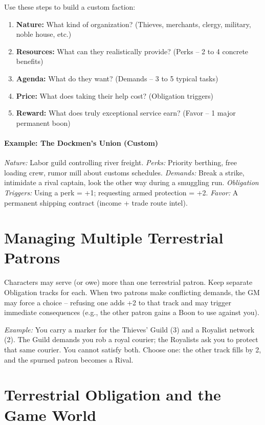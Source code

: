 Use these steps to build a custom faction:

\begin{enumerate}
  \item \textbf{Nature:} What kind of organization? (Thieves, merchants, clergy, military, noble house, etc.)
  \item \textbf{Resources:} What can they realistically provide? (Perks – 2 to 4 concrete benefits)
  \item \textbf{Agenda:} What do they want? (Demands – 3 to 5 typical tasks)
  \item \textbf{Price:} What does taking their help cost? (Obligation triggers)
  \item \textbf{Reward:} What does truly exceptional service earn? (Favor – 1 major permanent boon)
\end{enumerate}

\paragraph{Example: The Dockmen’s Union (Custom)}  
\textit{Nature:} Labor guild controlling river freight.  
\textit{Perks:} Priority berthing, free loading crew, rumor mill about customs schedules.  
\textit{Demands:} Break a strike, intimidate a rival captain, look the other way during a smuggling run.  
\textit{Obligation Triggers:} Using a perk = +1; requesting armed protection = +2.  
\textit{Favor:} A permanent shipping contract (income + trade route intel).

\section{Managing Multiple Terrestrial Patrons}

Characters may serve (or owe) more than one terrestrial patron. Keep separate Obligation tracks for each. When two patrons make conflicting demands, the GM may force a choice – refusing one adds +2 to that track and may trigger immediate consequences (e.g., the other patron gains a Boon to use against you).

\emph{Example:} You carry a marker for the Thieves’ Guild (3) and a Royalist network (2). The Guild demands you rob a royal courier; the Royalists ask you to protect that same courier. You cannot satisfy both. Choose one: the other track fills by 2, and the spurned patron becomes a Rival.

\section{Terrestrial Obligation and the Game World}


